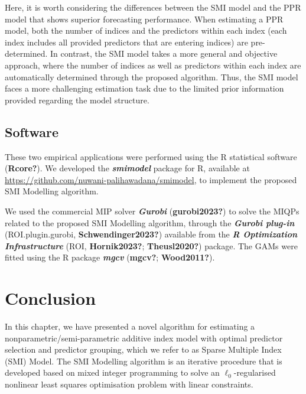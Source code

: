 \documentclass[
  11pt,
  a4paper,
]{report}
\begin{document}
Here, it is worth considering the differences between the SMI model and
the PPR model that shows superior forecasting performance. When
estimating a PPR model, both the number of indices and the predictors
within each index (each index includes all provided predictors that are
entering indices) are pre-determined. In contrast, the SMI model takes a
more general and objective approach, where the number of indices as well
as predictors within each index are automatically determined through the
proposed algorithm. Thus, the SMI model faces a more challenging
estimation task due to the limited prior information provided regarding
the model structure.

\subsection{Software}\label{software}

These two empirical applications were performed using the R statistical
software (\textbf{Rcore?}). We developed the \textbf{\emph{smimodel}}
package for R, available at
\url{https://github.com/nuwani-palihawadana/smimodel}, to implement the
proposed SMI Modelling algorithm.

We used the commercial MIP solver \textbf{\emph{Gurobi}}
(\textbf{gurobi2023?}) to solve the MIQPs related to the proposed SMI
Modelling algorithm, through the \textbf{\emph{Gurobi plug-in}}
(ROI.plugin.gurobi, \textbf{Schwendinger2023?}) available from the
\textbf{\emph{R Optimization Infrastructure}} (ROI,
\textbf{Hornik2023?}; \textbf{Theusl2020?}) package. The GAMs were
fitted using the R package \textbf{\emph{mgcv}} (\textbf{mgcv?};
\textbf{Wood2011?}).

\section{Conclusion}\label{sec-concl}

In this chapter, we have presented a novel algorithm for estimating a
nonparametric/semi-parametric additive index model with optimal
predictor selection and predictor grouping, which we refer to as Sparse
Multiple Index (SMI) Model. The SMI Modelling algorithm is an iterative
procedure that is developed based on mixed integer programming to solve
an \(\ell_{0}\)-regularised nonlinear least squares optimisation problem
with linear constraints.
\end{document}
